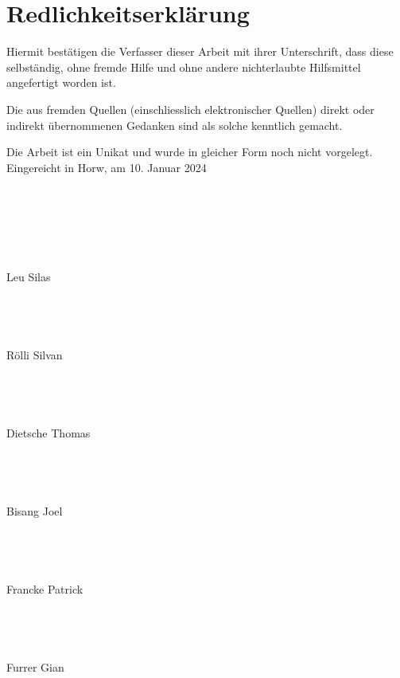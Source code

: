 \documentclass[../main.tex]{subfiles}
\begin{document}
\newpage
\section*{Redlichkeitserklärung}
\thispagestyle{empty}

 
Hiermit bestätigen die Verfasser dieser Arbeit mit ihrer Unterschrift, dass diese selbständig, ohne fremde Hilfe und ohne andere nichterlaubte Hilfsmittel angefertigt worden ist. 

 

Die aus fremden Quellen (einschliesslich elektronischer Quellen) direkt oder indirekt übernommenen Gedanken sind als solche kenntlich gemacht. 

 

Die Arbeit ist ein Unikat und wurde in gleicher Form noch nicht vorgelegt.\\

 

Eingereicht in Horw, am 10. Januar 2024
\\
\\
\\
\\
\\
\\
\\
Leu Silas
\\
\\
\\
\\
\\
Rölli Silvan
\\
\\
\\
\\
\\
Dietsche Thomas
\\
\\
\\
\\
\\
Bisang Joel
\\
\\
\\
\\
\\
Francke Patrick
\\
\\
\\
\\
\\
Furrer Gian
\end{document}
